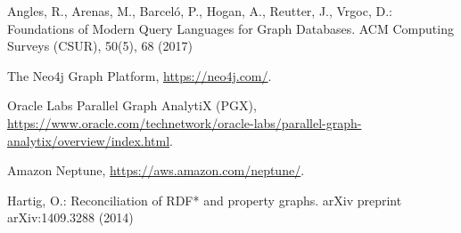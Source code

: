 \documentclass[runningheads]{llncs}
\begin{document}

%
%
%
% 
% 
%
\begin{thebibliography}{8}

Angles, R., Arenas, M., Barceló, P., Hogan, A., Reutter, J., Vrgoc, D.: Foundations of Modern Query Languages for Graph Databases. ACM Computing Surveys (CSUR), 50(5), 68 (2017)

The Neo4j Graph Platform, \url{https://neo4j.com/}.

Oracle Labs Parallel Graph AnalytiX (PGX), \url{https://www.oracle.com/technetwork/oracle-labs/parallel-graph-analytix/overview/index.html}.

Amazon Neptune, \url{https://aws.amazon.com/neptune/}.

Hartig, O.: Reconciliation of RDF* and property graphs. arXiv preprint arXiv:1409.3288 (2014)

\end{thebibliography}
\end{document}
